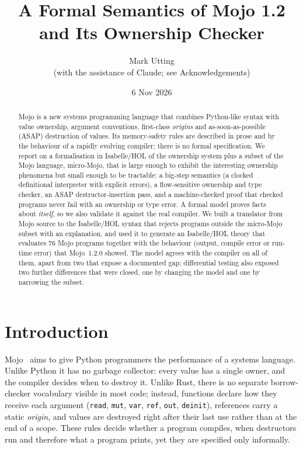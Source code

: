 \documentclass[11pt,a4paper]{article}
\title{A Formal Semantics of Mojo 1.2 and Its Ownership Checker}
\author{Mark Utting\\ \small (with the assistance of Claude; see Acknowledgements)}
\date{6 Nov 2026}
\newcommand{\micro}{micro-Mojo}
\newcommand{\IHOL}{Isabelle/HOL}
\newcommand{\code}[1]{\texttt{#1}}
\begin{document}
\maketitle

\begin{abstract}
Mojo is a new systems programming language that combines Python-like syntax
with value ownership, argument conventions, first-class \emph{origins} and
as-soon-as-possible (ASAP) destruction of values. Its memory-safety rules are
described in prose and by the behaviour of a rapidly evolving compiler;
there is no formal specification. We report on a formalisation in \IHOL{} of
the ownership system plus a subset of the Mojo language,
\micro{}, that is large enough to exhibit the interesting ownership phenomena
but small enough to be tractable: a big-step semantics (a clocked
definitional interpreter with explicit errors), a flow-sensitive ownership and
type checker, an ASAP destructor-insertion pass, and a machine-checked proof
that checked programs never fail with an ownership or type error. A formal
model proves facts about \emph{itself}, so we also validate it against the real
compiler. We built a translator from Mojo source to the \IHOL{} syntax that
rejects programs outside the \micro{} subset with an explanation, and used it to generate
an \IHOL{} theory that evaluates 76 Mojo programs together with the
behaviour (output, compile error or run-time error) that Mojo~1.2.0 showed. The
model agrees with the compiler on all of them, apart from two that expose a
documented gap; differential testing also exposed two further differences that
were closed, one by changing the model and one by narrowing the subset.
\end{abstract}

\section{Introduction}

Mojo~\cite{mojo-manual} aims to give Python programmers the performance of a
systems language. Unlike Python it has no garbage collector: every value has a
single owner, and the compiler decides when to destroy it. Unlike Rust, there
is no separate borrow-checker vocabulary visible in most code; instead,
functions declare how they receive each argument (\code{read}, \code{mut},
\code{var}, \code{ref}, \code{out}, \code{deinit}), references carry a static
\emph{origin}, and values are destroyed right after their last use rather than
at the end of a scope. These rules decide whether a program compiles, when
destructors run and therefore what a program prints, yet they are specified
only informally.
\end{document}
